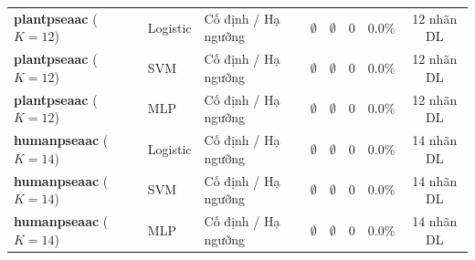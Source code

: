 \documentclass[10pt,a4paper,twoside]{article}
\begin{document}
\begin{table}[H]
{\begin{tabular}{lllccccc}
\midrule
\textbf{plantpseaac} ($K=12$) & Logistic & Cố định / Hạ ngưỡng & $\emptyset$ & $\emptyset$ & 0 & 0.0\% & 12 nhãn DL \\
\textbf{plantpseaac} ($K=12$) & SVM & Cố định / Hạ ngưỡng & $\emptyset$ & $\emptyset$ & 0 & 0.0\% & 12 nhãn DL \\
\textbf{plantpseaac} ($K=12$) & MLP & Cố định / Hạ ngưỡng & $\emptyset$ & $\emptyset$ & 0 & 0.0\% & 12 nhãn DL \\
\midrule
\textbf{humanpseaac} ($K=14$) & Logistic & Cố định / Hạ ngưỡng & $\emptyset$ & $\emptyset$ & 0 & 0.0\% & 14 nhãn DL \\
\textbf{humanpseaac} ($K=14$) & SVM & Cố định / Hạ ngưỡng & $\emptyset$ & $\emptyset$ & 0 & 0.0\% & 14 nhãn DL \\
\textbf{humanpseaac} ($K=14$) & MLP & Cố định / Hạ ngưỡng & $\emptyset$ & $\emptyset$ & 0 & 0.0\% & 14 nhãn DL \\
\bottomrule
\end{tabular}%
}
\end{table}
\end{document}
